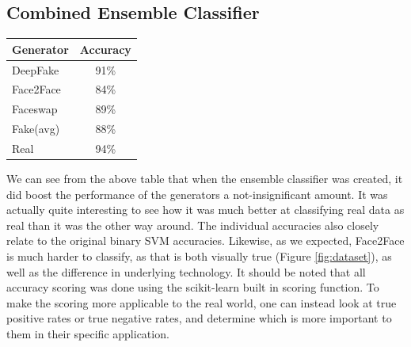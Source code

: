 \documentclass[11pt,twocolumn,letterpaper]{article}
\begin{document}
\subsection{Combined Ensemble Classifier}

\begin{table}[h]
    \centering
\begin{tabular}{|l|c|}
\hline
Generator & Accuracy \\ \hline
DeepFake  & 91\%     \\ \hline
Face2Face & 84\%     \\ \hline
Faceswap  & 89\%     \\ \hline
Fake(avg) & 88\%     \\ \hline
Real      & 94\%     \\ \hline
\end{tabular}
\end{table}\par
We can see from the above table that when the ensemble classifier was created, it did boost the performance of the generators a not-insignificant amount. It was actually quite interesting to see how it was much better at classifying real data as real than it was the other way around. The individual accuracies also closely relate to the original binary SVM accuracies. Likewise, as we expected, Face2Face is much harder to classify, as that is both visually true (Figure \ref{fig:dataset}), as well as the difference in underlying technology. It should be noted that all accuracy scoring was done using the scikit-learn built in scoring function. To make the scoring more applicable to the real world, one can instead look at true positive rates or true negative rates, and determine which is more important to them in their specific application.\par
\end{document}
